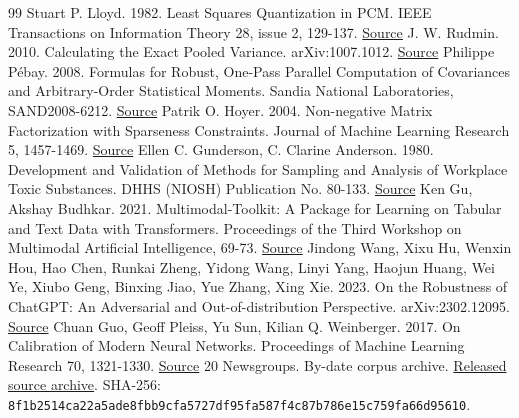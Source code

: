 \documentclass[10pt,letterpaper]{article}
\begin{document}
\begin{thebibliography}{99}
Stuart P. Lloyd. 1982. Least Squares Quantization in PCM. IEEE Transactions on Information Theory 28, issue 2, 129-137. \href{https://doi.org/10.1109/TIT.1982.1056489}{Source}
J. W. Rudmin. 2010. Calculating the Exact Pooled Variance. arXiv:1007.1012. \href{https://arxiv.org/abs/1007.1012}{Source}
Philippe Pébay. 2008. Formulas for Robust, One-Pass Parallel Computation of Covariances and Arbitrary-Order Statistical Moments. Sandia National Laboratories, SAND2008-6212. \href{https://digital.library.unt.edu/ark:/67531/metadc837537/m2/1/high_res_d/1028931.pdf}{Source}
Patrik O. Hoyer. 2004. Non-negative Matrix Factorization with Sparseness Constraints. Journal of Machine Learning Research 5, 1457-1469. \href{https://www.jmlr.org/papers/v5/hoyer04a.html}{Source}
Ellen C. Gunderson, C. Clarine Anderson. 1980. Development and Validation of Methods for Sampling and Analysis of Workplace Toxic Substances. DHHS (NIOSH) Publication No. 80-133. \href{https://stacks.cdc.gov/view/cdc/209393/cdc_209393_DS1.pdf}{Source}
Ken Gu, Akshay Budhkar. 2021. Multimodal-Toolkit: A Package for Learning on Tabular and Text Data with Transformers. Proceedings of the Third Workshop on Multimodal Artificial Intelligence, 69-73. \href{https://aclanthology.org/2021.maiworkshop-1.10/}{Source}
Jindong Wang, Xixu Hu, Wenxin Hou, Hao Chen, Runkai Zheng, Yidong Wang, Linyi Yang, Haojun Huang, Wei Ye, Xiubo Geng, Binxing Jiao, Yue Zhang, Xing Xie. 2023. On the Robustness of ChatGPT: An Adversarial and Out-of-distribution Perspective. arXiv:2302.12095. \href{https://arxiv.org/abs/2302.12095}{Source}
Chuan Guo, Geoff Pleiss, Yu Sun, Kilian Q. Weinberger. 2017. On Calibration of Modern Neural Networks. Proceedings of Machine Learning Research 70, 1321-1330. \href{https://proceedings.mlr.press/v70/guo17a.html}{Source}
20 Newsgroups. By-date corpus archive. \href{https://ndownloader.figshare.com/files/5975967}{Released source archive}. SHA-256: \nolinkurl{8f1b2514ca22a5ade8fbb9cfa5727df95fa587f4c87b786e15c759fa66d95610}.
\end{thebibliography}
\endgroup
\end{document}
